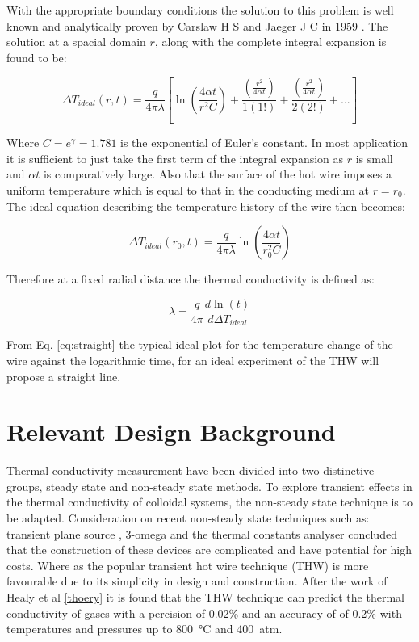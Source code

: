 \documentclass[12pt,MEng]{UoAThesis}
\begin{document}
With the appropriate boundary conditions the solution to this problem is well known and analytically proven by Carslaw H S and Jaeger J C in 1959 \cite{carslaw1959}. The solution at a spacial domain $r$, along with the complete integral expansion is found to be:

\begin{equation}
\Delta T_{ideal}(r,t) = \frac{q}{4 \pi \lambda} \left[ \ln \left( \frac{4 \alpha t}{r^2 C}\right) + \frac{\left( \frac{r^2}{4 \alpha t} \right)}{1(1!)} + \frac{\left( \frac{r^2}{4 \alpha t} \right)}{2(2!)} + ... \right]
\end{equation}

\noindent Where $ C = e^{\gamma} = 1.781 $ is the exponential of Euler's constant. In most application it is sufficient to just take the first term of the integral expansion as $r$ is small and $\alpha t$ is comparatively large. Also that the surface of the hot wire imposes a uniform temperature which is equal to that in the conducting medium at $r = r_0$. The ideal equation describing the temperature history of the wire then becomes:

\begin{equation} \label{eq:ideal}
\Delta T_{ideal}(r_0,t) =  \frac{q}{4 \pi \lambda} \ln \left( \frac{4 \alpha t}{r^2_0 C}\right)
\end{equation}

\noindent Therefore at a fixed radial distance the thermal conductivity is defined as:

\begin{equation} \label{eq:straight}
\lambda =  \frac{q}{4 \pi} \frac{d\ln \left( t \right)}{d\Delta T_{ideal}}
\end{equation}

\noindent From Eq. \ref{eq:straight} the typical ideal plot for the temperature change of the wire against the logarithmic time, for an ideal experiment of the THW will propose a straight line. 


\section{Relevant Design Background}
Thermal conductivity measurement have been divided into two distinctive groups, steady state and non-steady state methods. To explore transient effects in the thermal conductivity of colloidal systems, the non-steady state technique is to be adapted. Consideration on recent non-steady state techniques such as: transient plane source \cite{tps}, 3-omega \cite{omega} and the thermal constants analyser \cite{tca} concluded that the construction of these devices are complicated and have potential for high costs. Where as the popular transient hot wire technique (THW) is more favourable due to its simplicity in design and construction. After the work of Healy et al \ref{thoery} it is found that the THW technique can predict the thermal conductivity of gases with a percision of 0.02\% and an accuracy of of 0.2\% with temperatures and pressures up to \SI{800}{\celsius} and \SI{400}{atm}.
\end{document}
